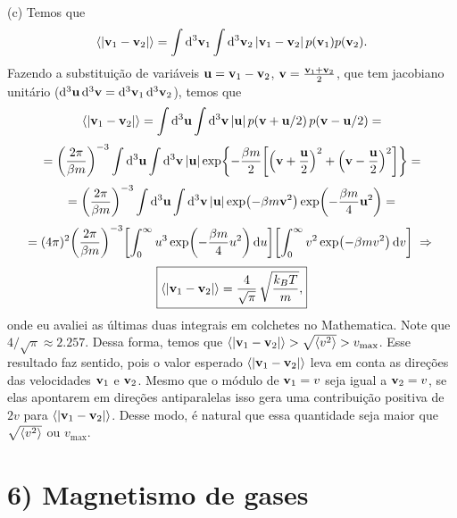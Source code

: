 \documentclass[a4paper,10pt]{article}
\begin{document}
\n

(c) Temos que
$$
\ev{\abs{\v_1 - \v_2}} = \int \dd[3]{\v_1} \int \dd[3]{\v_2} \abs{\v_1 - \v_2} \, p(\v_1) p(\v_2).
$$
Fazendo a substituição de variáveis $\vb{u} = \vb{v}_1 - \vb{v}_2$, $\vb{v} = \frac{\vb{v}_1 + \vb{v}_2}{2}$, que tem jacobiano unitário ($\dd[3]{\vb{u}} \dd[3]{\vb{v}} = \dd[3]{\vb{v}_1} \dd[3]{\vb{v}_2}$), temos que
$$
\ev{\abs{\v_1 - \v_2}} = \int \dd[3]{\u} \int \dd[3]{\v} \abs{\u} \, p(\v + \u/2) \, p(\v - \u/2) =
$$
$$
= \qty(\frac{2\pi}{\beta m})^{-3} \int \dd[3]{\vb{u}} \int \dd[3]{\vb{v}} \abs{\vb{u}}
\exp{-\frac{\beta m}{2} \qty[\qty(\vb{v}+ \frac{\vb{u}}{2})^2 + \qty(\vb{v}- \frac{\vb{u}}{2})^2]} =
$$
$$
= \qty(\frac{2\pi}{\beta m})^{-3} \int \dd[3]{\vb{u}} \int \dd[3]{\vb{v}} \abs{\vb{u}}
\exp(-\beta m \vb{v}^2) \exp(-\frac{\beta m}{4} \vb{u}^2) =
$$
$$
= (4\pi)^2 \qty(\frac{2\pi}{\beta m})^{-3} \qty[ \int_0^\infty u^3 \exp(-\frac{\beta m}{4} u^2) \dd{u} ]
\qty[ \int_0^\infty v^2 \exp(-\beta m v^2) \dd{v} ] \; \Rightarrow \;
$$
$$
\boxed{\ev{\abs{\v_1 - \v_2}} = \frac{4}{\sqrt{\pi}} \, \sqrt{\frac{k_B T}{m}},}
$$
onde eu avaliei as últimas duas integrais em colchetes no Mathematica. Note que $4/\sqrt{\pi} \approx 2.257$. Dessa forma, temos que $\ev{\abs{\v_1 - \v_2}} > \sqrt{\ev{v^2}} > v_{\text{max}}$. Esse resultado faz sentido, pois o valor esperado $\ev{\abs{\v_1 - \v_2}}$ leva em conta as direções das velocidades $\vb{v}_1$ e $\vb{v}_2$. Mesmo que o módulo de $\vb{v}_1 = v$ seja igual a $\vb{v}_2 = v$, se elas apontarem em direções antiparalelas isso gera uma contribuição positiva de $2v$ para $\ev{\abs{\v_1 - \v_2}}$. Desse modo, é natural que essa quantidade seja maior que $\sqrt{\ev{v^2}}$ ou $v_{\text{max}}$.



\pagebreak

\section*{6) Magnetismo de gases}
\end{document}
